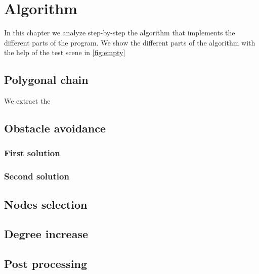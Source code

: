 \documentclass[dissertation.tex]{subfiles}
\begin{document}
\chapter{Algorithm}
In this chapter we analyze step-by-step the algorithm that implements
the different parts of the program. We show the different parts of the
algorithm with the help of the test scene in \cref{fig:empty}
\section{Polygonal chain}
We extract the 

\section{Obstacle avoidance}
\subsection{First solution}
\subsection{Second solution}
\section{Nodes selection}
\section{Degree increase}
\section{Post processing}
\end{document}
